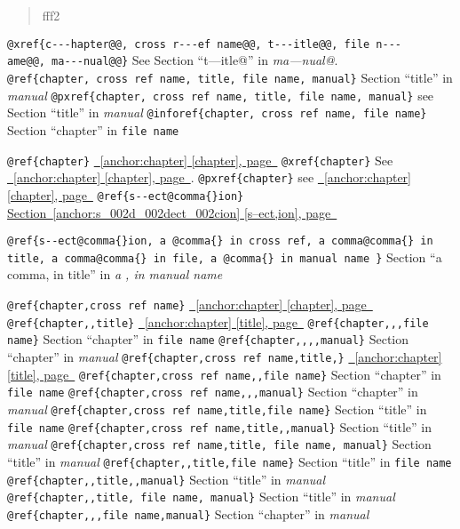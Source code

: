 \documentclass{book}
\begin{document}
%
\begin{quote}
\unskip{\parskip=0pt\noindent}%
fff2
\end{quote}


\texttt{@xref\{c{-}{-}{-}hapter@@,\ cross r{-}{-}{-}ef name@@,\ t{-}{-}{-}itle@@,\ file n{-}{-}{-}ame@@,\ ma{-}{-}{-}nual@@\}} See Section ``t---itle@'' in \textsl{ma---nual@}.
\texttt{@ref\{chapter,\ cross ref name,\ title,\ file name,\ manual\}} Section ``title'' in \textsl{manual}
\texttt{@pxref\{chapter,\ cross ref name,\ title,\ file name,\ manual\}} see Section ``title'' in \textsl{manual}
\texttt{@inforef\{chapter,\ cross ref name,\ file name\}} Section ``chapter'' in \texttt{file name}

\texttt{@ref\{chapter\}} \hyperref[anchor:chapter]{\chaptername~\ref*{anchor:chapter} [chapter], page~\pageref*{anchor:chapter}}
\texttt{@xref\{chapter\}} See \hyperref[anchor:chapter]{\chaptername~\ref*{anchor:chapter} [chapter], page~\pageref*{anchor:chapter}}.
\texttt{@pxref\{chapter\}} see \hyperref[anchor:chapter]{\chaptername~\ref*{anchor:chapter} [chapter], page~\pageref*{anchor:chapter}}
\texttt{@ref\{s{-}{-}ect@comma\{\}ion\}} \hyperref[anchor:s_002d_002dect_002cion]{Section~\ref*{anchor:s_002d_002dect_002cion} [s--ect,ion], page~\pageref*{anchor:s_002d_002dect_002cion}}

\texttt{@ref\{s{-}{-}ect@comma\{\}ion,\ a @comma\{\} in cross
ref,\ a comma@comma\{\} in title,\ a comma@comma\{\} in file,\ a @comma\{\} in manual name \}}
Section ``a comma, in title'' in \textsl{a , in manual name}

\texttt{@ref\{chapter,cross ref name\}} \hyperref[anchor:chapter]{\chaptername~\ref*{anchor:chapter} [chapter], page~\pageref*{anchor:chapter}}
\texttt{@ref\{chapter{,}{,}title\}} \hyperref[anchor:chapter]{\chaptername~\ref*{anchor:chapter} [title], page~\pageref*{anchor:chapter}}
\texttt{@ref\{chapter{,}{,},file name\}} Section ``chapter'' in \texttt{file name}
\texttt{@ref\{chapter{,}{,}{,}{,}manual\}} Section ``chapter'' in \textsl{manual}
\texttt{@ref\{chapter,cross ref name,title,\}} \hyperref[anchor:chapter]{\chaptername~\ref*{anchor:chapter} [title], page~\pageref*{anchor:chapter}}
\texttt{@ref\{chapter,cross ref name{,}{,}file name\}} Section ``chapter'' in \texttt{file name}
\texttt{@ref\{chapter,cross ref name{,}{,},manual\}} Section ``chapter'' in \textsl{manual}
\texttt{@ref\{chapter,cross ref name,title,file name\}} Section ``title'' in \texttt{file name}
\texttt{@ref\{chapter,cross ref name,title{,}{,}manual\}} Section ``title'' in \textsl{manual}
\texttt{@ref\{chapter,cross ref name,title,\ file name,\ manual\}} Section ``title'' in \textsl{manual}
\texttt{@ref\{chapter{,}{,}title,file name\}} Section ``title'' in \texttt{file name}
\texttt{@ref\{chapter{,}{,}title{,}{,}manual\}} Section ``title'' in \textsl{manual}
\texttt{@ref\{chapter{,}{,}title,\ file name,\ manual\}} Section ``title'' in \textsl{manual}
\texttt{@ref\{chapter{,}{,},file name,manual\}} Section ``chapter'' in \textsl{manual}
\end{document}
